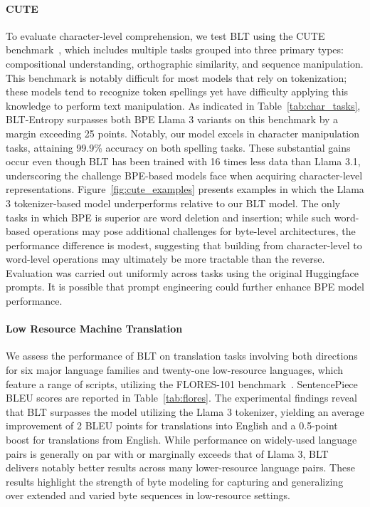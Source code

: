 \paragraph{CUTE}
To evaluate character-level comprehension, we test {\textsc BLT} using the CUTE benchmark~\citep{edman2024cute}, which includes multiple tasks grouped into three primary types: compositional understanding, orthographic similarity, and sequence manipulation. This benchmark is notably difficult for most models that rely on tokenization; these models tend to recognize token spellings yet have difficulty applying this knowledge to perform text manipulation. As indicated in Table~\ref{tab:char_tasks}, {\textsc BLT}-Entropy surpasses both BPE Llama 3 variants on this benchmark by a margin exceeding 25 points. Notably, our model excels in character manipulation tasks, attaining 99.9\% accuracy on both spelling tasks. These substantial gains occur even though {\textsc BLT} has been trained with 16 times less data than Llama 3.1, underscoring the challenge BPE-based models face when acquiring character-level representations. Figure~\ref{fig:cute_examples} presents examples in which the Llama 3 tokenizer-based model underperforms relative to our {\textsc BLT} model. The only tasks in which BPE is superior are word deletion and insertion; while such word-based operations may pose additional challenges for byte-level architectures, the performance difference is modest, suggesting that building from character-level to word-level operations may ultimately be more tractable than the reverse. Evaluation was carried out uniformly across tasks using the original Huggingface prompts. It is possible that prompt engineering could further enhance BPE model performance.

\paragraph{Low Resource Machine Translation} We assess the performance of {\textsc BLT} on translation tasks involving both directions for six major language families and twenty-one low-resource languages, which feature a range of scripts, utilizing the FLORES-101 benchmark~\citep{goyal2022flores}. SentencePiece BLEU scores are reported in Table~\ref{tab:flores}. The experimental findings reveal that {\textsc BLT} surpasses the model utilizing the Llama 3 tokenizer, yielding an average improvement of 2 BLEU points for translations into English and a 0.5-point boost for translations from English. While performance on widely-used language pairs is generally on par with or marginally exceeds that of Llama 3, {\textsc BLT} delivers notably better results across many lower-resource language pairs. These results highlight the strength of byte modeling for capturing and generalizing over extended and varied byte sequences in low-resource settings.

